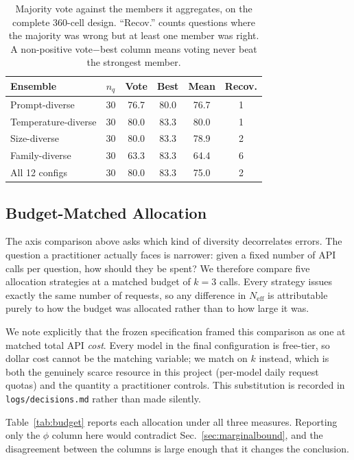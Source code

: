 \documentclass[conference]{IEEEtran}
\begin{document}
\begin{table}[!htb]
\centering
\caption{Majority vote against the members it aggregates, on the complete 360-cell design. ``Recov.'' counts questions where the majority was wrong but at least one member was right. A non-positive vote${-}$best column means voting never beat the strongest member.}
\label{tab:voting}
\begin{tabular}{lccccc}
\toprule
Ensemble & $n_q$ & Vote & Best & Mean & Recov. \\
\midrule
Prompt-diverse & 30 & 76.7 & 80.0 & 76.7 & 1 \\
Temperature-diverse & 30 & 80.0 & 83.3 & 80.0 & 1 \\
Size-diverse & 30 & 80.0 & 83.3 & 78.9 & 2 \\
Family-diverse & 30 & 63.3 & 83.3 & 64.4 & 6 \\
\midrule
All 12 configs & 30 & 80.0 & 83.3 & 75.0 & 2 \\
\bottomrule
\end{tabular}
\end{table}

\subsection{Budget-Matched Allocation}
\label{sec:budget}
The axis comparison above asks which kind of diversity decorrelates errors.
The question a practitioner actually faces is narrower: given a fixed
number of API calls per question, how should they be spent? We therefore
compare five allocation strategies at a matched budget of $k=3$ calls.
Every strategy issues exactly the same number of requests, so any
difference in $N_\text{eff}$ is attributable purely to how the budget was
allocated rather than to how large it was.

We note explicitly that the frozen specification framed this comparison as
one at matched total API \emph{cost}. Every model in the final
configuration is free-tier, so dollar cost cannot be the matching
variable; we match on $k$ instead, which is both the genuinely scarce
resource in this project (per-model daily request quotas) and the quantity
a practitioner controls. This substitution is recorded in
\texttt{logs/decisions.md} rather than made silently.

Table~\ref{tab:budget} reports each allocation under all three measures.
Reporting only the $\phi$ column here would contradict
Sec.~\ref{sec:marginalbound}, and the disagreement between the columns is
large enough that it changes the conclusion.
\end{document}
